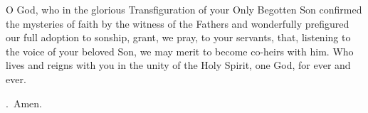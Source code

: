 \lettrine[lines=3]{O}{} God, who in the glorious Transfiguration
of your Only Begotten Son
confirmed the mysteries of faith by the witness of the Fathers
and wonderfully prefigured our full adoption to sonship,
grant, we pray, to your servants,
that, listening to the voice of your beloved Son,
we may merit to become co-heirs with him.
Who lives and reigns with you in the unity of the Holy Spirit,
one God, for ever and ever. \par \Rbar.~Amen.

